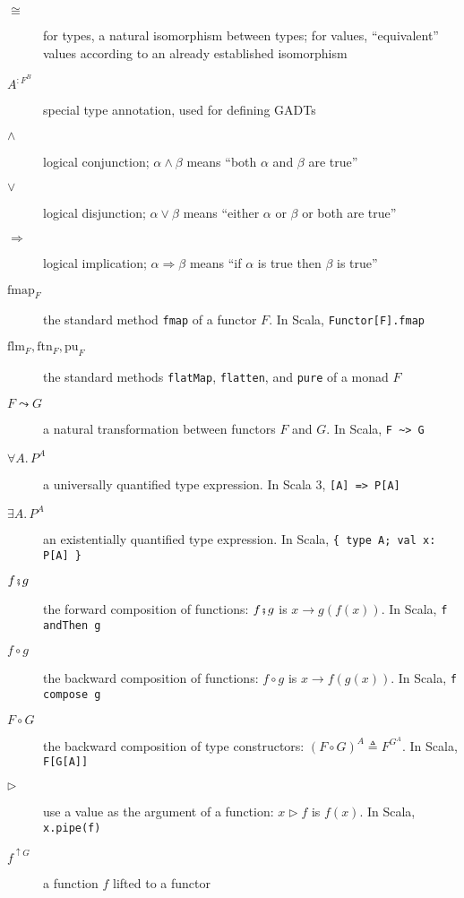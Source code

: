 \begin{description}
\item [{$\cong$}] \textemdash{} for types, a natural isomorphism between
types; for values, \textsf{``}equivalent\textsf{''} values according to an already
established isomorphism
\item [{$A^{:F^{B}}$}] \textemdash{} special type annotation, used for
defining GADTs
\item [{$\wedge$}] \textemdash{} logical conjunction; $\alpha\wedge\beta$
means \textsf{``}both $\alpha$ and $\beta$ are true\textsf{''}
\item [{$\vee$}] \textemdash{} logical disjunction; $\alpha\vee\beta$
means \textsf{``}either $\alpha$ or $\beta$ or both are true\textsf{''}
\item [{$\Rightarrow$}] \textemdash{} logical implication; $\alpha\Rightarrow\beta$
means \textsf{``}if $\alpha$ is true then $\beta$ is true\textsf{''}
\item [{$\text{fmap}_{F}$}] \textemdash{} the standard method \lstinline!fmap!
of a functor $F$. In Scala, \lstinline!Functor[F].fmap!
\item [{$\text{flm}_{F},\text{ftn}_{F},\text{pu}_{F}$}] \textemdash{}
the standard methods \lstinline!flatMap!, \lstinline!flatten!, and
\lstinline!pure! of a monad $F$
\item [{$F\leadsto G$}] \textemdash{} a natural transformation between
functors $F$ and $G$. In Scala, \lstinline!F ~> G!
\item [{$\forall A.\,P^{A}$}] \textemdash{} a universally quantified type
expression. In Scala 3, \lstinline![A] => P[A]!
\item [{$\exists A.\,P^{A}$}] \textemdash{} an existentially quantified
type expression. In Scala, \lstinline!{ type A; val x: P[A] }! 
\item [{$f\bef g$}] \textemdash{} the forward composition of functions:
$f\bef g$ is $x\rightarrow g(f(x))$. In Scala, \lstinline!f andThen g!
\item [{$f\circ g$}] \textemdash{} the backward composition of functions:
$f\circ g$ is $x\rightarrow f(g(x))$. In Scala, \lstinline!f compose g!
\item [{$F\circ G$}] \textemdash{} the backward composition of type constructors:
$(F\circ G)^{A}\triangleq F^{G^{A}}$. In Scala, \lstinline!F[G[A]]! 
\item [{$\triangleright$}] \textemdash{} use a value as the argument of
a function: $x\triangleright f$ is $f(x)$. In Scala, \lstinline!x.pipe(f)!
\item [{$f^{\uparrow G}$}] \textemdash{} a function $f$ lifted to a functor

\end{description}
